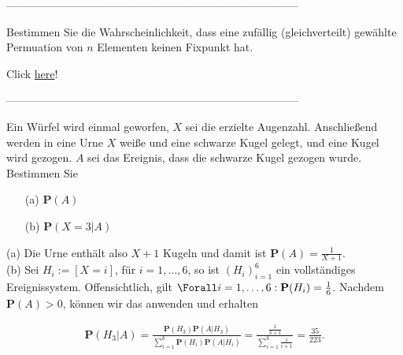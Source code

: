 --------------------------------------------------------------------------------

\begin{exercise}

Bestimmen Sie die Wahrscheinlichkeit, dass eine zufällig (gleichverteilt) gewählte Permuation von $n$ Elementen keinen Fixpunkt hat.

\end{exercise}

\begin{solution}

Click \href{https://de.wikipedia.org/wiki/Fixpunktfreie_Permutation}{here}!

\end{solution}

--------------------------------------------------------------------------------

\begin{exercise}

Ein Würfel wird einmal geworfen, $X$ sei die erzielte Augenzahl. Anschließend werden in eine Urne $X$ weiße und eine schwarze Kugel gelegt, und eine Kugel wird gezogen. $A$ sei das Ereignis, dass die schwarze Kugel gezogen wurde. Bestimmen Sie

\begin{itemize}
  \item[(a)] $\mathbf{P}(A)$
  \item[(b)] $\mathbf{P}(X = 3 | A)$
\end{itemize}

\end{exercise}

\begin{solution}

(a) Die Urne enthält also $X + 1$ Kugeln und damit ist $\mathbf{P}(A) = \frac{1}{X + 1}$. \\

(b) Sei $H_i := [X = i]$, für $i = 1, \ldots, 6$, so ist $(H_i)_{i=1}^6$ ein vollständiges Ereignissystem. Offensichtlich, gilt $\Forall i = 1, \ldots, 6: \mathbf{P}(H_i) = \frac{1}{6}$. Nachdem $\mathbf{P}(A) > 0$, können wir das  anwenden und erhalten

\begin{align*}
  \mathbf{P}(H_3 | A)
  =
  \frac
  {\mathbf{P}(H_3) \mathbf{P}(A | H_3)}
  {\sum_{i=1}^6 \mathbf{P}(H_i) \mathbf{P}(A | H_i)}
  =
  \frac
  {\frac{1}{3+1}}
  {\sum_{i=1}^6 \frac{1}{i+1}}
  = \frac{35}{223}.
\end{align*}

\end{solution}

